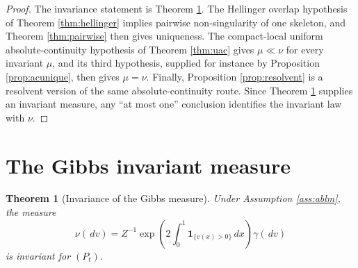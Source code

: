 \documentclass[12pt]{article}
\newcommand{\1}{\mathbf 1}
\newcommand{\dd}{\,d}
\theoremstyle{plain}
\newtheorem{theorem}{Theorem}[section]
\theoremstyle{definition}
\theoremstyle{remark}
\numberwithin{equation}{section}
\begin{document}
\begin{proof}
The invariance statement is Theorem \ref{thm:invariance}.  The Hellinger
overlap hypothesis of Theorem \ref{thm:hellinger} implies pairwise
non-singularity of one skeleton, and Theorem \ref{thm:pairwise} then gives
uniqueness.  The compact-local uniform absolute-continuity hypothesis of
Theorem \ref{thm:uac} gives \(\mu\ll\nu\) for every invariant \(\mu\), and its
third hypothesis, supplied for instance by Proposition \ref{prop:acunique},
then gives \(\mu=\nu\).  Finally, Proposition \ref{prop:resolvent} is a
resolvent version of the same absolute-continuity route.  Since
Theorem \ref{thm:invariance} supplies an invariant measure, any ``at most one''
conclusion identifies the invariant law with \(\nu\).
\end{proof}

\section{The Gibbs invariant measure}

\begin{theorem}[Invariance of the Gibbs measure]\label{thm:invariance}
Under Assumption \ref{ass:ablm}, the measure
\[
\nu(\dd v)
=
Z^{-1}\exp\!\left(2\int_0^1\1_{\{v(x)>0\}}\dd x\right)\gamma(\dd v)
\]
is invariant for \((P_t)\).
\end{theorem}
\end{document}
